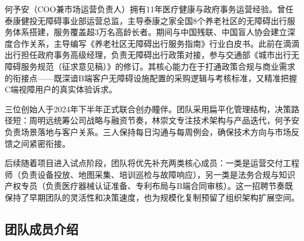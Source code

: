 \documentclass[a4paper,fontset=none]{ctexart}
\begin{document}
何予安（COO兼市场运营负责人）拥有11年医疗健康与政府事务运营经验。曾任泰康健投无障碍事业部运营总监，主导泰康之家全国8个养老社区的无障碍出行服务体系搭建，服务覆盖超3万名高龄长者。期间与中国残联、中国盲人协会建立深度合作关系，主导编写《养老社区无障碍出行服务指南》行业白皮书。此前在滴滴出行担任政府事务高级经理，负责无障碍出行政策对接，参与交通部《城市出行无障碍服务规范（征求意见稿）》的修订。其核心能力在于打通政策合规与商业需求的衔接点——既深谙B端客户无障碍设施配置的采购逻辑与考核标准，又精准把握C端视障用户的真实体验诉求。

三位创始人于2024年下半年正式联合创办瞳伴。团队采用扁平化管理结构，决策路径短：周明远统筹公司战略与融资节奏，林崇文专注技术架构与产品迭代，何予安负责场景落地与客户关系。三人保持每日沟通与每周例会，确保技术方向与市场反馈之间紧密衔接。

后续随着项目进入试点阶段，团队将优先补充两类核心成员：一类是运营交付工程师（负责设备投放、地图采集、培训巡检与故障响应），另一类是法务合规与知识产权专员（负责医疗器械认证准备、专利布局与B端合同审核）。这一招聘节奏既保持了早期团队的灵活性和决策速度，也为规模化复制预留了组织架构扩展空间。

\subsection{团队成员介绍}
\end{document}
